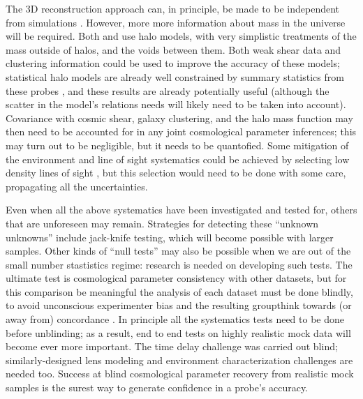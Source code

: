 The 3D reconstruction approach can, in principle, be made to be
independent from simulations \citep[indeed, this was a design feature
of][]{McCullyEtal2014}.  However, more  more information about mass in
the universe will be required.  Both \citet{McCullyEtal2014} and
\citet{CollettEtal2013} use halo models, with very simplistic treatments
of the mass outside of halos, and the voids between them. Both weak
shear data and clustering information could be used to improve the
accuracy of these  models; statistical halo models are already well
constrained by summary statistics from these probes
\citep[e.g.][]{CouponEtal2015},  and these results are already
potentially useful (although the scatter in the model's relations needs
will likely need to be taken into account).  Covariance with cosmic
shear, galaxy clustering, and the halo mass function may then  need to
be accounted for in any joint cosmological parameter inferences; this
may turn out to be negligible, but it needs to be quantofied.  Some
mitigation of the environment and line of sight systematics could be
achieved by selecting low density lines of sight
\citep{CollettEtal2013}, but this selection would need to be done with
some care, propagating all the uncertainties.



Even when all the above systematics have been investigated and tested
for, others that are unforeseen may remain. Strategies for detecting
these ``unknown unknowns'' include jack-knife testing, which  will
become possible with larger samples. Other kinds of ``null tests'' may
also be possible when we are out of the small number stastistics regime:
research is needed on developing such tests. The ultimate test is
cosmological parameter consistency with other datasets, but for this
comparison be meaningful the analysis of each dataset must be done
blindly, to avoid unconscious experimenter bias and the resulting
groupthink towards (or away from) concordance
\citep[see e.g.][]{ConleyEtal2006,SuyuEtal2013}. In principle all the
systematics tests  need to be done before unblinding; as a result, end
to end tests on highly realistic mock data will become ever more
important. The time delay challenge was carried out blind;
similarly-designed lens modeling and environment characterization
challenges are needed too. Success at blind cosmological parameter
recovery from realistic mock samples is the surest way to generate
confidence in a probe's accuracy.



